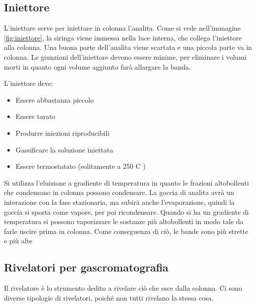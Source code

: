 \subsection{Iniettore}
L'iniettore serve per iniettare in colonna l'analita. Come si vede nell'immagine \ref{fig:iniettore}, la siringa viene immessa nella luce interna, che collega l'iniettore alla colonna. Una buona parte dell'analita viene scartata e una piccola parte va in colonna. Le giunzioni dell'iniettore devono essere minime, per eliminare i volumi morti in quanto ogni volume aggiunto farà allargare la banda.


L'iniettore deve:
\begin{itemize}
\item Essere abbastanza piccolo
\item Essere tarato
\item Produrre iniezioni riproducibili
\item Gassificare la soluzione iniettata
\item Essere termostatato (solitamente a 250 C \degree)
\end{itemize}

Si utilizza l'eluizione a gradiente di temperatura in quanto le frazioni altobollenti che condensano in colonna possono condensare. La goccia di analita avrà un interazione con la fase stazionaria, ma subirà anche l'evaporazione, quindi la goccia si sposta come vapore, per poi ricondensare. Quando si ha un gradiente di temperatura si possono vaporizzare le sostanze più altobollenti in modo tale da farle uscire prima in colonna. Come conseguenza di ciò, le bande sono più strette e più alte

\subsection{Rivelatori per gascromatografia}
Il rivelatore è lo strumento dedito a rivelare ciò che esce dalla colonna. Ci sono diverse tipologie di rivelatori, poiché non tutti rivelano la stessa cosa.

